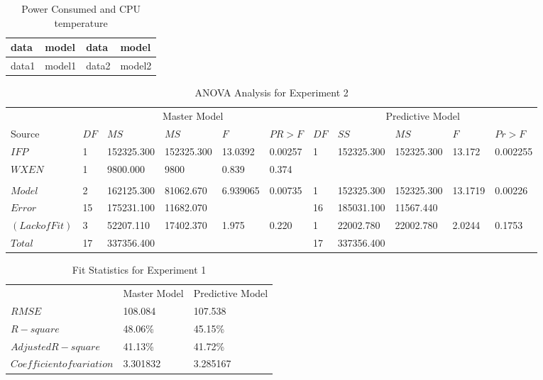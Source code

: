 \documentclass[times, 10pt,onecolumn]{article}
\begin{document}
\label{sec:references}
\nocite{*}



\begin{table}
  \centering
  \begin{tabular}{ll|ll}
    data&model&data&model\\
    \hline
    data1&model1&data2&model2 \\
  \end{tabular}
  \caption{Power Consumed and CPU temperature}
  \label{tab:exp1}
\end{table}

\begin{table}
  \centering
  \begin{tabular}{llllll|lllll}
    \multicolumn{1}{c}{} & \multicolumn{5}{c|}{Master Model}&\multicolumn{5}{c}{Predictive Model} \\
    Source&$DF$&$MS$&$MS$&$F$&$PR>F$&$DF$&$SS$&$MS$&$F$&$Pr>F$ \\
    \hline
    $IFP$&1&152325.300&152325.300 &13.0392&0.00257&1&152325.300&152325.300&13.172&0.002255 \\
    $WXEN$&1&9800.000&9800&0.839&0.374&&&&& \\
    &&&&&&&&&& \\
    $Model$&2&162125.300&81062.670&6.939065&0.00735&1&152325.300&152325.300&13.1719&0.00226\\
    $Error$&15&175231.100&11682.070&&&16&185031.100&11567.440&&\\
    $(Lack of Fit)$&3&52207.110&17402.370&1.975&0.220&1&22002.780&22002.780&2.0244&0.1753\\
    $Total$&17&337356.400& & & &17&337356.400&&& \\
  \end{tabular}
  \caption{ANOVA Analysis for Experiment 2}
  \label{tab:exp1anova}
\end{table}

\begin{table}
  \centering
  \begin{tabular}{l|ll}
    &Master Model&Predictive Model \\
    $RMSE$&108.084&107.538\\
    $R-square$&48.06\%&45.15\% \\
    $Adjusted R-square$&41.13\%&41.72\% \\
    $Coefficient of variation$&3.301832&3.285167 \\
  \end{tabular}
  \caption{Fit Statistics for Experiment 1}
  \label{tab:exp1fit}
\end{table}
\end{document}
